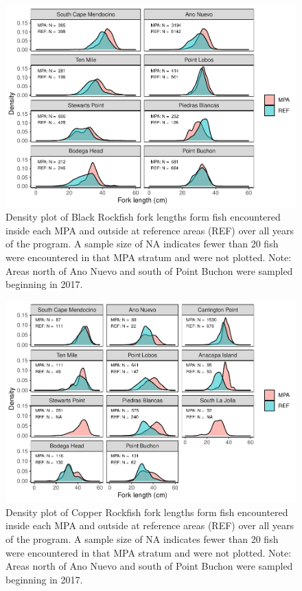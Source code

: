 \documentclass[
]{article}
\begin{document}
\begin{figure}
\centering
\includegraphics{CCRFP_available_data_for_assessments_files/figure-latex/lengths-1.pdf}
\caption{\label{fig:lengths-1}Density plot of Black Rockfish fork lengths form fish encountered inside each MPA and outside at reference areas (REF) over all years of the program. A sample size of NA indicates fewer than 20 fish were encountered in that MPA stratum and were not plotted. Note: Areas north of Ano Nuevo and south of Point Buchon were sampled beginning in 2017.}
\end{figure}

\begin{figure}
\centering
\includegraphics{CCRFP_available_data_for_assessments_files/figure-latex/lengths-2.pdf}
\caption{\label{fig:lengths-2}Density plot of Copper Rockfish fork lengths form fish encountered inside each MPA and outside at reference areas (REF) over all years of the program. A sample size of NA indicates fewer than 20 fish were encountered in that MPA stratum and were not plotted. Note: Areas north of Ano Nuevo and south of Point Buchon were sampled beginning in 2017.}
\end{figure}
\end{document}
